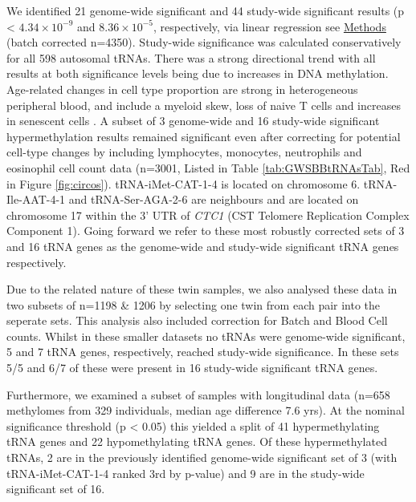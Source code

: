 \documentclass[]{book}
\begin{document}
We identified 21 genome-wide significant and 44 study-wide significant results (p \textless{} \(4.34\times10^{-9}\) and \(8.36\times10^{-5}\), respectively, via linear regression see \protect\hyperlink{medipmodels}{Methods} (batch corrected n=4350).
Study-wide significance was calculated conservatively for all 598 autosomal tRNAs.
There was a strong directional trend with all results at both significance levels being due to increases in DNA methylation.
Age-related changes in cell type proportion are strong in heterogeneous peripheral blood, and include a myeloid skew, loss of naive T cells and increases in senescent cells \citep{Geiger2013}.
A subset of 3 genome-wide and 16 study-wide significant hypermethylation results remained significant even after correcting for potential cell-type changes by including lymphocytes, monocytes, neutrophils and eosinophil cell count data (n=3001, Listed in Table \ref{tab:GWSBBtRNAsTab}, Red in Figure \ref{fig:circos}).
tRNA-iMet-CAT-1-4 is located on chromosome 6.
tRNA-Ile-AAT-4-1 and tRNA-Ser-AGA-2-6 are neighbours and are located on chromosome 17 within the 3' UTR of \emph{CTC1} (CST Telomere Replication Complex Component 1).
Going forward we refer to these most robustly corrected sets of 3 and 16 tRNA genes as the genome-wide and study-wide significant tRNA genes respectively.

Due to the related nature of these twin samples, we also analysed these data in two subsets of n=1198 \& 1206 by selecting one twin from each pair into the seperate sets.
This analysis also included correction for Batch and Blood Cell counts.
Whilst in these smaller datasets no tRNAs were genome-wide significant, 5 and 7 tRNA genes, respectively, reached study-wide significance.
In these sets 5/5 and 6/7 of these were present in 16 study-wide significant tRNA genes.

Furthermore, we examined a subset of samples with longitudinal data (n=658 methylomes from 329 individuals, median age difference 7.6 yrs).
At the nominal significance threshold (p \textless{} 0.05) this yielded a split of 41 hypermethylating tRNA genes and 22 hypomethylating tRNA genes.
Of these hypermethylated tRNAs, 2 are in the previously identified genome-wide significant set of 3 (with tRNA-iMet-CAT-1-4 ranked 3rd by p-value) and 9 are in the study-wide significant set of 16.
\end{document}
